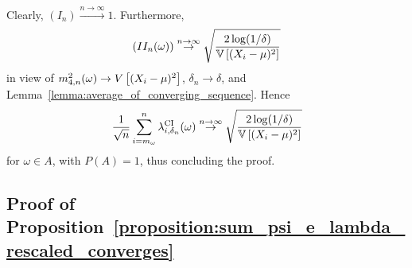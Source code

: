     Clearly, $(I_n) \stackrel{n\to\infty}{\to} 1$. Furthermore,
    \begin{align*}
        (II_n(\omega)) \stackrel{n\to\infty}{\to} \sqrt \frac{2 \log (1 / \delta)}{\mathbb{V} \left[ (X_i-\mu)^2\right]}
    \end{align*}
    in view of $m_{4, n}^2(\omega) \to V \left[ (X_i-\mu)^2\right]$, $\delta_n \to \delta$, and Lemma~\ref{lemma:average_of_converging_sequence}. Hence
    \begin{align*}
        \frac{1}{\sqrt{n}} \sum_{i = m_\omega}^n \lambda_{i,\delta_n}^{\text{CI}}(\omega) \stackrel{n\to\infty}{\to} \sqrt \frac{2 \log (1 / \delta)}{\mathbb{V} \left[ (X_i-\mu)^2\right]} 
    \end{align*}
    for $\omega \in A$, with $P(A) = 1$, thus concluding the proof.

\subsection{Proof of Proposition~\ref{proposition:sum_psi_e_lambda_rescaled_converges}} \label{proof:sum_psi_e_lambda_rescaled_converges}

